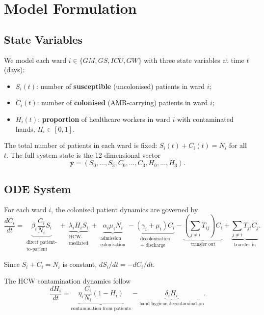 \documentclass[12pt,a4paper]{article}
\begin{document}
\section{Model Formulation}

\subsection{State Variables}

We model each ward $i \in \{GM, GS, ICU, GW\}$ with three state variables at time $t$ (days):
\begin{itemize}
  \item $S_i(t)$: number of \textbf{susceptible} (uncolonised) patients in ward $i$;
  \item $C_i(t)$: number of \textbf{colonised} (AMR-carrying) patients in ward $i$;
  \item $H_i(t)$: \textbf{proportion} of healthcare workers in ward $i$ with contaminated hands, $H_i \in [0,1]$.
\end{itemize}

The total number of patients in each ward is fixed: $S_i(t) + C_i(t) = N_i$ for all $t$. The full system state is the 12-dimensional vector
\[
\mathbf{y} = (S_0, \ldots, S_3, C_0, \ldots, C_3, H_0, \ldots, H_3).
\]

\subsection{ODE System}

For each ward $i$, the colonised patient dynamics are governed by
\begin{equation}
\label{eq:1}
\frac{dC_i}{dt}
=
\underbrace{\beta_i \frac{C_i}{N_i} S_i}_{\substack{\text{direct patient-}\\\text{to-patient}}}
+
\underbrace{\lambda_i H_i S_i}_{\substack{\text{HCW-}\\\text{mediated}}}
+
\underbrace{\alpha_i \mu_i N_i}_{\substack{\text{admission}\\\text{colonisation}}}
-
\underbrace{(\gamma_i + \mu_i) C_i}_{\substack{\text{decolonisation}\\\text{+ discharge}}}
-
\underbrace{\left(\sum_{j \neq i} T_{ij}\right) C_i}_{\text{transfer out}}
+
\underbrace{\sum_{j \neq i} T_{ji} C_j}_{\text{transfer in}}.
\end{equation}

Since $S_i + C_i = N_i$ is constant, $dS_i/dt = -dC_i/dt$.

The HCW contamination dynamics follow
\begin{equation}
\label{eq:2}
\frac{dH_i}{dt}
=
\underbrace{\eta_i \frac{C_i}{N_i}(1 - H_i)}_{\text{contamination from patients}}
-
\underbrace{\delta_i H_i}_{\text{hand hygiene decontamination}}.
\end{equation}
\end{document}
